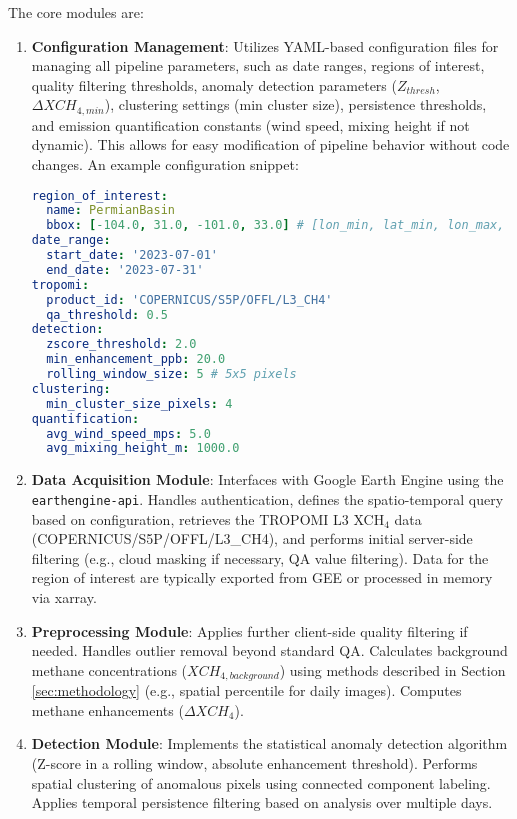 \documentclass[12pt,a4paper]{article}
\begin{document}
The core modules are:
\begin{enumerate}
    \item \textbf{Configuration Management}:
    Utilizes YAML-based configuration files for managing all pipeline parameters, such as date ranges, regions of interest, quality filtering thresholds, anomaly detection parameters ($Z_{thresh}$, $\Delta XCH_{4,min}$), clustering settings (min cluster size), persistence thresholds, and emission quantification constants (wind speed, mixing height if not dynamic). This allows for easy modification of pipeline behavior without code changes. An example configuration snippet:
\begin{lstlisting}[language=YAML, caption=Example YAML configuration snippet, label=lst:yaml_config]
region_of_interest:
  name: PermianBasin
  bbox: [-104.0, 31.0, -101.0, 33.0] # [lon_min, lat_min, lon_max, lat_max]
date_range:
  start_date: '2023-07-01'
  end_date: '2023-07-31'
tropomi:
  product_id: 'COPERNICUS/S5P/OFFL/L3_CH4'
  qa_threshold: 0.5
detection:
  zscore_threshold: 2.0
  min_enhancement_ppb: 20.0
  rolling_window_size: 5 # 5x5 pixels
clustering:
  min_cluster_size_pixels: 4
quantification:
  avg_wind_speed_mps: 5.0
  avg_mixing_height_m: 1000.0
\end{lstlisting}

    \item \textbf{Data Acquisition Module}:
    Interfaces with Google Earth Engine using the \texttt{earthengine-api}. Handles authentication, defines the spatio-temporal query based on configuration, retrieves the TROPOMI L3 XCH$_4$ data (COPERNICUS/S5P/OFFL/L3\_CH4), and performs initial server-side filtering (e.g., cloud masking if necessary, QA value filtering). Data for the region of interest are typically exported from GEE or processed in memory via xarray.

    \item \textbf{Preprocessing Module}:
    Applies further client-side quality filtering if needed. Handles outlier removal beyond standard QA. Calculates background methane concentrations ($XCH_{4,background}$) using methods described in Section \ref{sec:methodology} (e.g., spatial percentile for daily images). Computes methane enhancements ($\Delta XCH_4$).

    \item \textbf{Detection Module}:
    Implements the statistical anomaly detection algorithm (Z-score in a rolling window, absolute enhancement threshold). Performs spatial clustering of anomalous pixels using connected component labeling. Applies temporal persistence filtering based on analysis over multiple days.


\end{enumerate}
\end{document}
